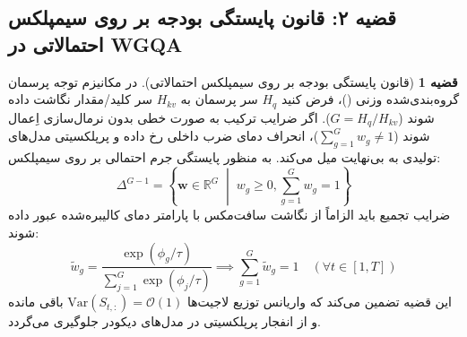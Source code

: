 \documentclass[12pt,a4paper]{report}
\theoremstyle{definition}
\newtheorem{theorem}{قضیه}[chapter]
\begin{document}
\subsection{قضیه ۲: قانون پایستگی بودجه بر روی سیمپلکس احتمالاتی در WGQA}
\begin{theorem}[قانون پایستگی بودجه بر روی سیمپلکس احتمالاتی]
\label{thm:simplex_conservation}
در مکانیزم توجه پرسمان گروه‌بندی‌شده وزنی ()، فرض کنید $H_q$ سر پرسمان به $H_{kv}$ سر کلید/مقدار نگاشت داده شوند ($G = H_q / H_{kv}$). اگر ضرایب ترکیب به صورت خطی بدون نرمال‌سازی اِعمال شوند ($\sum_{g=1}^G w_g \ne 1$)، انحراف دمای ضرب داخلی رخ داده و پرپلکسیتی مدل‌های تولیدی به بی‌نهایت میل می‌کند. به منظور پایستگی جرم احتمالی بر روی سیمپلکس:
\begin{equation}
\Delta^{G-1} = \left\{ \mathbf{w} \in \mathbb{R}^G \;\middle|\; w_g \ge 0, \sum_{g=1}^G w_g = 1 \right\}
\end{equation}
ضرایب تجمیع باید الزاماً از نگاشت سافت‌مکس با پارامتر دمای کالیبره‌شده عبور داده شوند:
\begin{equation}
\tilde{w}_g = \frac{\exp(\phi_g / \tau)}{\sum_{j=1}^G \exp(\phi_j / \tau)} \implies \sum_{g=1}^G \tilde{w}_g = 1 \quad (\forall t \in [1, T])
\end{equation}
این قضیه تضمین می‌کند که واریانس توزیع لاجیت‌ها $\text{Var}(S_{t, :}) = \mathcal{O}(1)$ باقی مانده و از انفجار پرپلکسیتی در مدل‌های دیکودر جلوگیری می‌گردد.
\end{theorem}
\end{document}
